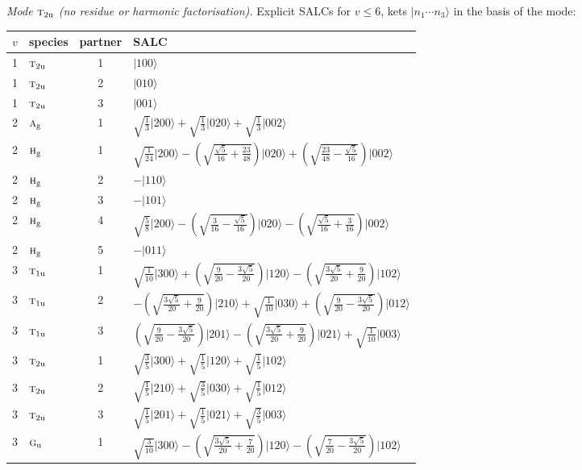 \documentclass[11pt]{article}
\newcommand{\irr}[1]{\text{\normalfont\scshape #1}}
\newcommand{\ptag}[1]{\mathrm{#1}}
\newcommand{\occ}[1]{\lvert #1\rangle}
\begin{document}
\emph{Mode $\irr{t}_{2\ptag{u}}$ (no residue or harmonic factorisation).} Explicit SALCs for $v\le6$, kets $\occ{n_1\cdots n_{3}}$ in the basis of the mode:
\begin{longtable}{c l c p{}}\hline $v$ & species & partner & SALC\\ \hline\endhead
1 & $\irr{t}_{2\ptag{u}}$ & 1 & $\occ{100}$\\
1 & $\irr{t}_{2\ptag{u}}$ & 2 & $\occ{010}$\\
1 & $\irr{t}_{2\ptag{u}}$ & 3 & $\occ{001}$\\
\hline
2 & $\irr{a}_{\ptag{g}}$ & 1 & $\sqrt{\tfrac{1}{3}}\occ{200}+\sqrt{\tfrac{1}{3}}\occ{020}+\sqrt{\tfrac{1}{3}}\occ{002}$\\
2 & $\irr{h}_{\ptag{g}}$ & 1 & $\sqrt{\tfrac{1}{24}}\occ{200}-(\sqrt{\frac{\sqrt{5}}{16} + \frac{23}{48}})\occ{020}+(\sqrt{\frac{23}{48} - \frac{\sqrt{5}}{16}})\occ{002}$\\
2 & $\irr{h}_{\ptag{g}}$ & 2 & $-\occ{110}$\\
2 & $\irr{h}_{\ptag{g}}$ & 3 & $-\occ{101}$\\
2 & $\irr{h}_{\ptag{g}}$ & 4 & $\sqrt{\tfrac{5}{8}}\occ{200}-(\sqrt{\frac{3}{16} - \frac{\sqrt{5}}{16}})\occ{020}-(\sqrt{\frac{\sqrt{5}}{16} + \frac{3}{16}})\occ{002}$\\
2 & $\irr{h}_{\ptag{g}}$ & 5 & $-\occ{011}$\\
\hline
3 & $\irr{t}_{1\ptag{u}}$ & 1 & $\sqrt{\tfrac{1}{10}}\occ{300}+(\sqrt{\frac{9}{20} - \frac{3 \sqrt{5}}{20}})\occ{120}-(\sqrt{\frac{3 \sqrt{5}}{20} + \frac{9}{20}})\occ{102}$\\
3 & $\irr{t}_{1\ptag{u}}$ & 2 & $-(\sqrt{\frac{3 \sqrt{5}}{20} + \frac{9}{20}})\occ{210}+\sqrt{\tfrac{1}{10}}\occ{030}+(\sqrt{\frac{9}{20} - \frac{3 \sqrt{5}}{20}})\occ{012}$\\
3 & $\irr{t}_{1\ptag{u}}$ & 3 & $(\sqrt{\frac{9}{20} - \frac{3 \sqrt{5}}{20}})\occ{201}-(\sqrt{\frac{3 \sqrt{5}}{20} + \frac{9}{20}})\occ{021}+\sqrt{\tfrac{1}{10}}\occ{003}$\\
3 & $\irr{t}_{2\ptag{u}}$ & 1 & $\sqrt{\tfrac{3}{5}}\occ{300}+\sqrt{\tfrac{1}{5}}\occ{120}+\sqrt{\tfrac{1}{5}}\occ{102}$\\
3 & $\irr{t}_{2\ptag{u}}$ & 2 & $\sqrt{\tfrac{1}{5}}\occ{210}+\sqrt{\tfrac{3}{5}}\occ{030}+\sqrt{\tfrac{1}{5}}\occ{012}$\\
3 & $\irr{t}_{2\ptag{u}}$ & 3 & $\sqrt{\tfrac{1}{5}}\occ{201}+\sqrt{\tfrac{1}{5}}\occ{021}+\sqrt{\tfrac{3}{5}}\occ{003}$\\
3 & $\irr{g}_{\ptag{u}}$ & 1 & $\sqrt{\tfrac{3}{10}}\occ{300}-(\sqrt{\frac{3 \sqrt{5}}{20} + \frac{7}{20}})\occ{120}-(\sqrt{\frac{7}{20} - \frac{3 \sqrt{5}}{20}})\occ{102}$\\

\end{longtable}
\end{document}
